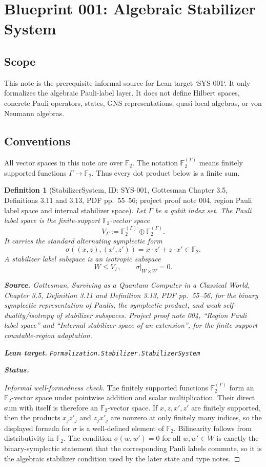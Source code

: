 \documentclass{article}
\newtheorem{definition}{Definition}
\newcommand{\source}[1]{\par\noindent\textbf{Source.} #1}
\newcommand{\lean}[1]{\par\noindent\textbf{Lean target.} \texttt{#1}}
\newcommand{\status}[1]{\par\noindent\textbf{Status.} \texttt{\detokenize{#1}}}
\begin{document}
\section*{Blueprint 001: Algebraic Stabilizer System}

\subsection*{Scope}

This note is the prerequisite informal source for Lean target `SYS-001`.  It
only formalizes the algebraic Pauli-label layer.  It does not define Hilbert
spaces, concrete Pauli operators, states, GNS representations, quasi-local
algebras, or von Neumann algebras.

\subsection*{Conventions}

All vector spaces in this note are over \(\mathbb F_2\).  The notation
\(\mathbb F_2^{(\Gamma)}\) means finitely supported functions
\(\Gamma\to\mathbb F_2\).  Thus every dot product below is a finite sum.

\begin{definition}[StabilizerSystem, ID: SYS-001, Gottesman Chapter 3.5, Definitions 3.11 and 3.13, PDF pp.~55--56; project proof note 004, region Pauli label space and internal stabilizer space]
Let \(\Gamma\) be a qubit index set.  The Pauli label space is the
finite-support \(\mathbb F_2\)-vector space
\[
  V_\Gamma := \mathbb F_2^{(\Gamma)} \oplus \mathbb F_2^{(\Gamma)}.
\]
It carries the standard alternating symplectic form
\[
  \sigma((x,z),(x',z')) = x\cdot z' + z\cdot x' \in \mathbb F_2.
\]
A stabilizer label subspace is an isotropic subspace
\[
  W \leq V_\Gamma, \qquad \sigma|_{W\times W}=0.
\]
\source{Gottesman, \emph{Surviving as a Quantum Computer in a Classical World},
Chapter 3.5, Definition 3.11 and Definition 3.13, PDF pp.~55--56, for the
binary symplectic representation of Paulis, the symplectic product, and weak
self-duality/isotropy of stabilizer subspaces.  Project proof note 004,
``Region Pauli label space'' and ``Internal stabilizer space of an extension'',
for the finite-support countable-region adaptation.}
\lean{Formalization.Stabilizer.StabilizerSystem}
\status{blueprint_note_complete}
\end{definition}

\begin{proof}[Informal well-formedness check]
The finitely supported functions \(\mathbb F_2^{(\Gamma)}\) form an
\(\mathbb F_2\)-vector space under pointwise addition and scalar
multiplication.  Their direct sum with itself is therefore an
\(\mathbb F_2\)-vector space.  If \(x,z,x',z'\) are finitely supported, then
the products \(x_jz'_j\) and \(z_jx'_j\) are nonzero at only finitely many
indices, so the displayed formula for \(\sigma\) is a well-defined element of
\(\mathbb F_2\).  Bilinearity follows from distributivity in \(\mathbb F_2\).
The condition \(\sigma(w,w')=0\) for all \(w,w'\in W\) is exactly the
binary-symplectic statement that the corresponding Pauli labels commute, so it
is the algebraic stabilizer condition used by the later state and type notes.
\end{proof}
\end{document}
